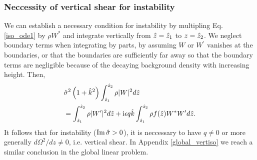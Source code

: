 

\subsubsection{Neccessity of vertical shear for
  instability}\label{integral_relation} 
We can establish a necessary condition for instability by multipling
Eq. \ref{iso_ode1} by $\rho W^*$ and integrate vertically from
$\hat{z}=\hat{z}_1$ to $z=\hat{z}_2$. We neglect boundary 
terms when integrating by parts, by assuming $W$ or
$W^\prime$ vanishes at the boundaries, or that the boundaries are 
sufficiently far away so that the boundary terms are negligible because of the
decaying background density with increasing height. Then,
\begin{align}
  &\hat{\sigma}^2\left(1+\hat{k}^2\right)\int_{\hat{z}_1}^{\hat{z}_2}\rho|W|^2d\hat{z} \notag\\
  &=\int_{\hat{z}_1}^{\hat{z}_2}\rho|W^\prime|^2d\hat{z} 
  +\mathrm{i} \epsilon q \hat{k}\int_{\hat{z}_1}^{\hat{z}_2}\rho f(\hat{z}) W^*W^\prime d\hat{z}.\label{integral_relation1}
\end{align}
It follows that for instability ($\operatorname{Im}\hat{\sigma}>0$), it is neccessary to
have $q\neq0$ or more generally $d\Omega^2/dz\neq 0$, i.e. vertical
shear. In Appendix \ref{global_vertiso} we reach a similar conclusion
in the global linear problem.   

